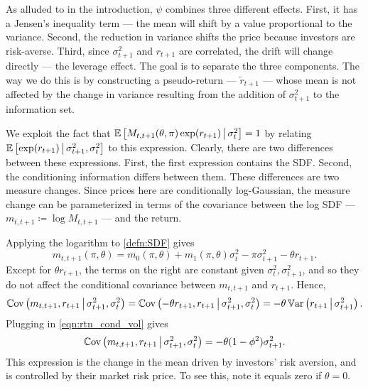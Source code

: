 \documentclass[11pt, letterpaper, twoside]{article}
\begin{document}
As alluded to in the introduction, $\psi$ combines three different effects. First, it has a Jensen's inequality term --- the mean will shift by a value proportional to the variance. Second, the reduction in variance shifts the price because investors are risk-averse. Third, since $\sigma^2_{t+1}$ and $r_{t+1}$ are correlated, the drift will change directly ---  the leverage effect. The goal is to separate the three components. The way we do this is by constructing a pseudo-return --- $\widetilde{r}_{t+1}$ --- whose mean is not affected by the change in variance resulting from the addition of $\sigma^2_{t+1}$ to the information set.

We exploit the fact that $\operatorname{\mathbb{E}}\left[M_{t,t+1}(\theta, \pi) \exp(r_{t+1}) \,\middle\vert\, \sigma^2_t \right] = 1$ by relating $\operatorname{\mathbb{E}}\left[\exp(r_{t+1}) \,\middle\vert\, \sigma^2_{t+1}, \sigma^2_t \right]$ to this expression. Clearly, there are two differences between these expressions. First, the first expression contains the SDF. Second, the conditioning information differs between them. These differences are two measure changes. Since prices here are conditionally log-Gaussian, the measure change can be parameterized in terms of the covariance between the log SDF --- $m_{t,t+1} \coloneqq \log M_{t,t+1}$ --- and the return.

Applying the logarithm to \cref{defn:SDF} gives
%
\begin{equation}
    \label{eqn:log_sdf}
    m_{t,t+1}(\pi, \theta) = m_{0}(\pi, \theta) + m_1(\pi, \theta) \sigma_t^2 - \pi \sigma^2_{t+1} - \theta r_{t+1}.
\end{equation}
%
Except for $\theta r_{t+1}$, the terms on the right are constant given $\sigma^2_t, \sigma^2_{t+1}$, and so they do not affect the conditional covariance between $m_{t,t+1}$ and $r_{t+1}$. Hence,
%
\begin{equation}
 \Cov\left(m_{t,t+1}, r_{t+1} \mvert \sigma^2_{t+1}, \sigma^2_t \right) 
%
 = \Cov\left(-\theta r_{t+1}, r_{t+1} \mvert \sigma^2_{t+1}, \sigma^2_t \right) 
%
 = -\theta \Var\left(r_{t+1} \mvert \sigma^2_{t+1}\right). 
\end{equation}
%
Plugging in \cref{eqn:rtn_cond_vol} gives
%
\begin{equation}
    \label{eqn:return_covarinace}
    \operatorname{\mathbb{C}ov}\left(m_{t,t+1}, r_{t+1} \,\middle\vert\, \sigma^2_{t+1}, \sigma^2_t \right) = -\theta (1 - \phi^2) \sigma^2_{t+1}.
\end{equation}
%
This expression is the change in the mean driven by investors' risk aversion, and is controlled by their market risk price. To see this, note it equals zero if $\theta = 0$.
\end{document}
